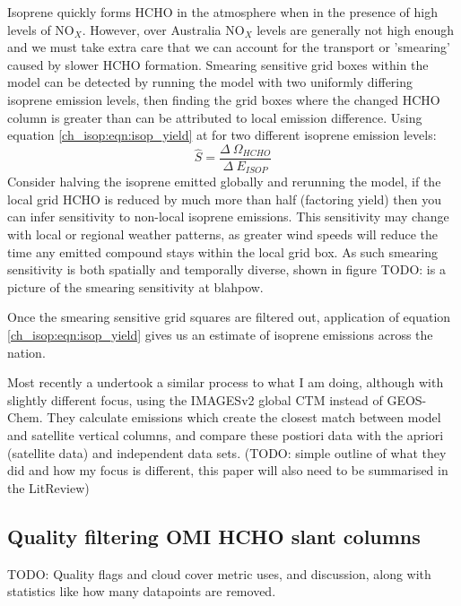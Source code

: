     Isoprene quickly forms HCHO in the atmosphere when in the presence of high levels of NO$_X$.
    However, over Australia NO$_X$ levels are generally not high enough and we must take extra care that we can account for the transport or 'smearing' caused by slower HCHO formation.
    Smearing sensitive grid boxes within the model can be detected by running the model with two uniformly differing isoprene emission levels, then finding the grid boxes where the changed HCHO column is greater than can be attributed to local emission difference.
    Using equation \ref{ch_isop:eqn:isop_yield} at for two different isoprene emission levels:
    \begin{equation*}
      \hat{S} = \frac{\Delta~\Omega_{HCHO}}{\Delta~E_{ISOP}}
    \end{equation*}
    Consider halving the isoprene emitted globally and rerunning the model, if the local grid HCHO is reduced by much more than half (factoring yield) then you can infer sensitivity to non-local isoprene emissions.
    This sensitivity may change with local or regional weather patterns, as greater wind speeds will reduce the time any emitted compound stays within the local grid box.
    As such smearing sensitivity is both spatially and temporally diverse, shown in figure TODO: is a picture of the smearing sensitivity at blahpow.
   
    Once the smearing sensitive grid squares are filtered out, application of equation \ref{ch_isop:eqn:isop_yield} gives us an estimate of isoprene emissions across the nation.
    
    Most recently a \citet{Bauwens2016} undertook a similar process to what I am doing, although with slightly different focus, using the IMAGESv2 global CTM instead of GEOS-Chem.
    They calculate emissions which create the closest match between model and satellite vertical columns, and compare these postiori data with the apriori (satellite data) and independent data sets.
    (TODO: simple outline of what they did and how my focus is different, this paper will also need to be summarised in the LitReview)

  \subsection{Quality filtering OMI HCHO slant columns}
    \label{ch_isop:sec:OMIFiltering}
    TODO: Quality flags and cloud cover metric uses, and discussion, along with statistics like how many datapoints are removed.
    
